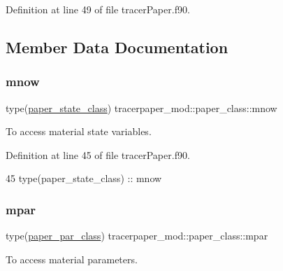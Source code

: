 Definition at line 49 of file tracer\+Paper.\+f90.



\subsection{Member Data Documentation}
\mbox{\label{structtracerpaper__mod_1_1paper__class_a737a7e41a12ed99f6d3deaddc0a07554}} 
\subsubsection{\texorpdfstring{mnow}{mnow}}
{\footnotesize\ttfamily type(\mbox{\hyperlink{structtracerpaper__mod_1_1paper__state__class}{paper\+\_\+state\+\_\+class}}) tracerpaper\+\_\+mod\+::paper\+\_\+class\+::mnow\hspace{0.3cm}{\ttfamily [private]}}



To access material state variables. 



Definition at line 45 of file tracer\+Paper.\+f90.


\begin{DoxyCode}
45         \textcolor{keywordtype}{type}(paper\_state\_class) :: mnow
\end{DoxyCode}
\mbox{\label{structtracerpaper__mod_1_1paper__class_a26cdff9536d77341f4c2d815400a7a86}} 
\subsubsection{\texorpdfstring{mpar}{mpar}}
{\footnotesize\ttfamily type(\mbox{\hyperlink{structtracerpaper__mod_1_1paper__par__class}{paper\+\_\+par\+\_\+class}}) tracerpaper\+\_\+mod\+::paper\+\_\+class\+::mpar\hspace{0.3cm}{\ttfamily [private]}}



To access material parameters. 



